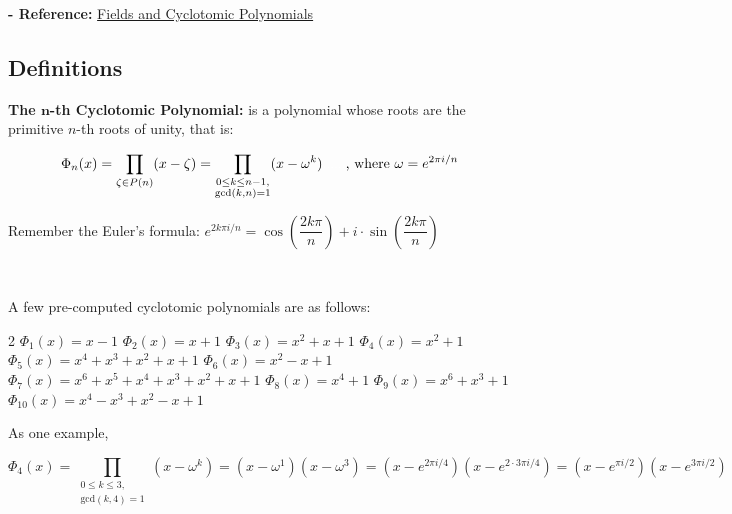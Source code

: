 \textbf{- Reference:} 
\href{https://e.math.cornell.edu/people/belk/numbertheory/CyclotomicPolynomials.pdf}{Fields and Cyclotomic Polynomials}~\cite{cyclotomic-polynomial}

\subsection{Definitions}
\label{subsec:cyclotomic-def}
\begin{tcolorbox}[title={\textbf{\tboxdef{\ref*{subsec:cyclotomic-def}} Cyclotomic Polynomial}}]
 \textbf{The $\bm{n}$-th Cyclotomic Polynomial:} is a polynomial whose roots are the primitive $n$-th roots of unity, that is: 
 
 \[ \Phi_n(x) = \prod_{\zeta \in P(n)} (x - \zeta)  = \prod_{\substack{0 \leq k \leq n-1,\\ 
 \text{gcd}(k, n) = 1}} (x - \omega^k) \textcolor{white}{......} \text{, where } \omega = e^{2\pi i/n} \]

 Remember the Euler's formula: $e^{2k\pi i/n} = \cos\left(\dfrac{2k\pi}{n}\right) + i\cdot\sin\left(\dfrac{2k\pi}{n}\right)$

$ $

A few pre-computed cyclotomic polynomials are as follows:
 
\begin{multicols}{2}
$\Phi_1(x) = x - 1$
\newline $\Phi_2(x) = x + 1$
\newline $\Phi_3(x) = x^2 + x + 1$
\newline $\Phi_4(x) = x^2 + 1$
\newline $\Phi_5(x) = x^4 + x^3 + x^2 + x + 1$
\newline $\Phi_6(x) = x^2 - x + 1$
\newline $\Phi_7(x) = x^6 + x^5 + x^4 + x^3 + x^2 + x + 1$
\newline $\Phi_8(x) = x^4 + 1$
\newline $\Phi_9(x) = x^6 + x^3 + 1$
\newline $\Phi_{10}(x) = x^4 - x^3 + x^2 - x + 1$
\end{multicols}
\end{tcolorbox}


As one example, 

\[\Phi_4(x) = \prod_{\substack{0 \leq k \leq 3,\\ 
 \text{gcd}(k, 4) = 1}} (x - \omega^k) = (x - \omega^1)(x - \omega^3) = (x - e^{2\pi i / 4})(x - e^{2\cdot3\pi i / 4}) = (x - e^{\pi i / 2})(x - e^{3\pi i / 2})\]

